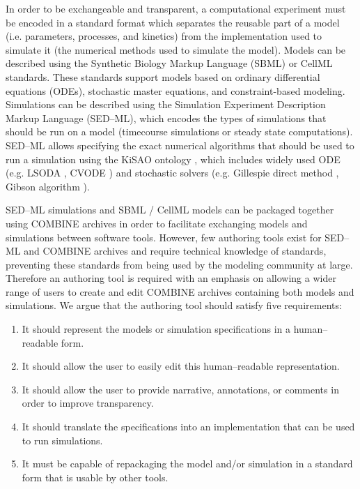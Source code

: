 \documentclass[10pt,letterpaper]{article}
\begin{document}
In order to be exchangeable and transparent, a computational experiment must be encoded in a standard format which separates the reusable part of a model (i.e. parameters, processes, and kinetics) from the implementation used to simulate it (the numerical methods used to simulate the model). Models can be described using the Synthetic Biology Markup Language (SBML) or CellML standards. These standards support models based on ordinary differential equations (ODEs), stochastic master equations, and constraint-based modeling. Simulations can be described using the Simulation Experiment Description Markup Language (SED--ML), which encodes the types of simulations that should be run on a model (timecourse simulations or steady state computations). SED--ML allows specifying the exact numerical algorithms that should be used to run a simulation using the KiSAO ontology \cite{courtot2011controlled}, which includes widely used ODE (e.g. LSODA \cite{petzold1989computing}, CVODE \cite{cohen1996cvode}) and stochastic solvers (e.g. Gillespie direct method \cite{gillespie1977exact}, Gibson algorithm \cite{gibson2000efficient}).


SED--ML simulations and SBML / CellML models can be packaged together using COMBINE archives \cite{bergmann2014combine} in order to facilitate exchanging models and simulations between software tools. However, few authoring tools exist for SED--ML and COMBINE archives \cite{bergmann2017sed,scharm2014combinearchiveweb} and require technical knowledge of standards, preventing these standards from being used by the modeling community at large. Therefore an authoring tool is required with an emphasis on allowing a wider range of users to create and edit COMBINE archives containing both models and simulations. We argue that the authoring tool should satisfy five requirements:

\begin{enumerate}
\item It should represent the models or simulation specifications in a human--readable form.
\item It should allow the user to easily edit this human--readable representation.
\item It should allow the user to provide narrative, annotations, or comments in order to improve transparency.
\item It should translate the specifications into an implementation that can be used to run simulations.
\item It must be capable of repackaging the model and/or simulation in a standard form that is usable by other tools.
\end{enumerate}
\end{document}

